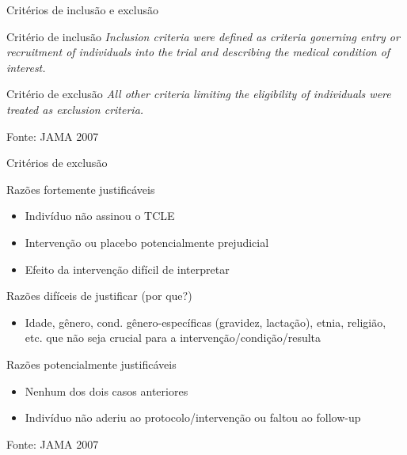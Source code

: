 \documentclass{beamer}
\begin{document}
\begin{frame}{Critérios de inclusão e exclusão}
  \begin{block}{Critério de inclusão}
    {\em Inclusion criteria were defined as criteria governing entry or
    recruitment of individuals into the trial and describing the
    medical condition of interest.}
  \end{block}
  \begin{block}{Critério de exclusão}
    {\em All other criteria limiting the eligibility of individuals were
    treated as exclusion criteria.}
  \end{block}

  \vfill
  \small
  Fonte: JAMA 2007
\end{frame}

\begin{frame}{Critérios de exclusão}
  \begin{block}{Razões fortemente justificáveis}
    \small
    \begin{itemize}
    \item Indivíduo não assinou o TCLE
    \item Intervenção ou placebo potencialmente prejudicial
    \item Efeito da intervenção difícil de interpretar
    \end{itemize}
  \end{block}
  \pause
  \begin{block}{Razões difíceis de justificar (por que?)}
    \small
    \begin{itemize}
    \item Idade, gênero, cond. gênero-específicas (gravidez, lactação), etnia, religião, etc. que não seja crucial para a intervenção/condição/resulta
    \end{itemize}
  \end{block}
  \pause
  \begin{block}{Razões potencialmente justificáveis}
    \small
    \begin{itemize}
    \item Nenhum dos dois casos anteriores
    \item Indivíduo não aderiu ao protocolo/intervenção ou faltou ao follow-up
    \end{itemize}
  \end{block}

  \vfill
  \small
  Fonte: JAMA 2007
\end{frame}
\end{document}
